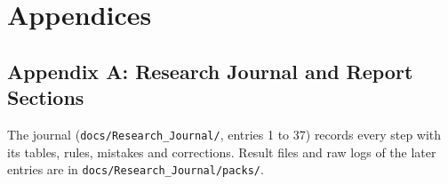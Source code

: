 \clearpage
\begingroup\singlespacing
\chapter*{Appendices}

\section*{Appendix A: Research Journal and Report Sections}

The journal (\texttt{docs/Research\_Journal/}, entries 1 to 37) records every step with its tables, rules, mistakes and corrections. Result files and raw logs of the later entries are in \texttt{docs/Research\_Journal/packs/}.

